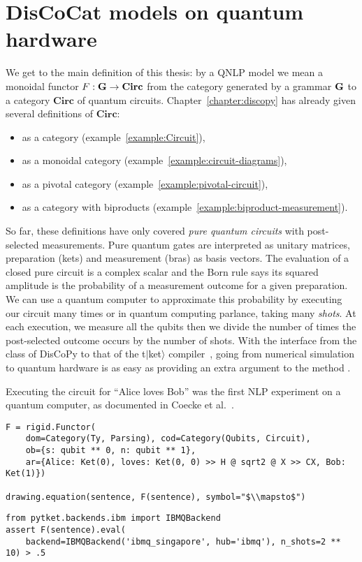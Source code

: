 
\section{DisCoCat models on quantum hardware}\label{section:discocat-qnlp}

We get to the main definition of this thesis: by a QNLP model we mean a monoidal functor $F : \mathbf{G} \to \mathbf{Circ}$ from the category generated by a grammar $\mathbf{G}$ to a category $\mathbf{Circ}$ of quantum circuits.
Chapter~\ref{chapter:discopy} has already given several definitions of $\mathbf{Circ}$:
\begin{itemize}
    \item as a category (example~\ref{example:Circuit}),
    \item as a monoidal category (example~\ref{example:circuit-diagrams}),
    \item as a pivotal category (example~\ref{example:pivotal-circuit}),
    \item as a category with biproducts (example~\ref{example:biproduct-measurement}).
\end{itemize}
So far, these definitions have only covered \emph{pure quantum circuits} with post-selected measurements. Pure quantum gates are interpreted as unitary matrices, preparation (kets) and measurement (bras) as basis vectors.
The evaluation of a closed pure circuit is a complex scalar and the Born rule says its squared amplitude is the probability of a measurement outcome for a given preparation.
We can use a quantum computer to approximate this probability by executing our circuit many times or in quantum computing parlance, taking many \emph{shots}.
At each execution, we measure all the qubits then we divide the number of times the post-selected outcome occurs by the number of shots.
With the interface from the  class of DisCoPy to that of the t$\vert$ket$\rangle$ compiler~\cite{SivarajahEtAl20}, going from numerical simulation to quantum hardware is as easy as providing an extra argument  to the method .

\begin{example}\label{example:circuit-alive-loves-bob}
Executing the circuit for ``Alice loves Bob'' was the first NLP experiment on a quantum computer, as documented in Coecke et al.~\cite{CoeckeEtAl20b}.

\begin{verbatim}
F = rigid.Functor(
    dom=Category(Ty, Parsing), cod=Category(Qubits, Circuit),
    ob={s: qubit ** 0, n: qubit ** 1},
    ar={Alice: Ket(0), loves: Ket(0, 0) >> H @ sqrt2 @ X >> CX, Bob: Ket(1)})

drawing.equation(sentence, F(sentence), symbol="$\\mapsto$")
\end{verbatim}
\begin{verbatim}
from pytket.backends.ibm import IBMQBackend
assert F(sentence).eval(
    backend=IBMQBackend('ibmq_singapore', hub='ibmq'), n_shots=2 ** 10) > .5
\end{verbatim}
\end{example}

